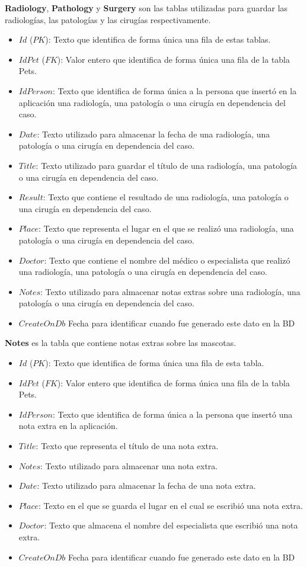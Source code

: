 \textbf{Radiology}, \textbf{Pathology} y \textbf{Surgery} son las tablas utilizadas para guardar las radiologías, las patologías y las cirugías respectivamente.


\begin{itemize}
	\item	$Id$ ($PK$): Texto que identifica de forma única una fila de estas tablas.
	\item	$IdPet$ ($FK$): Valor entero que identifica de forma única una fila de la tabla Pets.
	\item	$IdPerson$: Texto que identifica de forma única a la persona que insertó en la aplicación una radiología, una patología o una cirugía en dependencia del caso.
	\item	$Date$: Texto utilizado para almacenar la fecha de una radiología, una patología o una cirugía en dependencia del caso.
	\item	$Title$: Texto utilizado para guardar el título de una radiología, una patología o una cirugía en dependencia del caso.
	\item	$Result$: Texto que contiene el resultado de una radiología, una patología o una cirugía en dependencia del caso.
	\item	$Place$: Texto que representa el lugar en el que se realizó una radiología, una patología o una cirugía en dependencia del caso.
	\item	$Doctor$: Texto que contiene el nombre del médico o especialista que realizó una radiología, una patología o una cirugía en dependencia del caso.
	\item	$Notes$: Texto utilizado para almacenar notas extras sobre una radiología, una patología o una cirugía en dependencia del caso.
		\item	$CreateOnDb$ 
	Fecha para identificar cuando fue generado este dato en la BD
\end{itemize}


\textbf{Notes} es la tabla que contiene notas extras sobre las mascotas.


\begin{itemize}
	\item	$Id$ ($PK$): Texto que identifica de forma única una fila de esta tabla.
	\item	$IdPet$ ($FK$): Valor entero que identifica de forma única una fila de la tabla Pets.
	\item	$IdPerson$: Texto que identifica de forma única a la persona que insertó una nota extra en la aplicación.
	\item	$Title$: Texto que representa el título de una nota extra.
	\item	$Notes$: Texto utilizado para almacenar una nota extra.
	\item	$Date$: Texto utilizado para almacenar la fecha de una nota extra.
	\item	$Place$: Texto en el que se guarda el lugar en el cual se escribió una nota extra.
	\item	$Doctor$: Texto que almacena el nombre del especialista que escribió una nota extra.
	\item	$CreateOnDb$ 
Fecha para identificar cuando fue generado este dato en la BD
\end{itemize}


